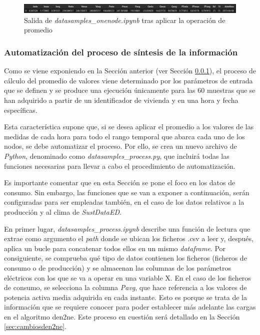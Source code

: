 \vspace{3mm}

\begin{figure}[h!]
  \centering
  \includegraphics[width=1\textwidth]{img/diseno/datasamples.png}
  \caption{Salida de \textit{datasamples\_onenode.ipynb} tras aplicar la operación de promedio}
  \label{fig:datasamples}
\end{figure}

\subsubsection{Automatización del proceso de síntesis de la información}
\label{sec:datasamples}

Como se viene exponiendo en la Sección anterior (ver Sección \ref{sec:datasamples}), el proceso de cálculo del promedio de valores viene determinado por los parámetros de entrada que se definen y se produce una ejecución únicamente para las 60 muestras que se han adquirido a partir de un identificador de vivienda y en una hora y fecha específicas. 

\vspace{3mm}

Esta característica supone que, si se desea aplicar el promedio a los valores de las medidas de cada hora para todo el rango temporal que abarca cada uno de los nodos, se debe automatizar el proceso. Por ello, se crea un nuevo archivo de \textit{Python}, denominado como \textit{datasamples\_process.py}, que incluirá todas las funciones necesarias para llevar a cabo el procedimiento de automatización. 

\vspace{3mm}

Es importante comentar que en esta Sección se pone el foco en los datos de consumo. Sin embargo, las funciones que se van a exponer a continuación, serán configuradas para ser empleadas también, en el caso de los datos relativos a la producción y al clima de \textit{SustDataED}.

\vspace{3mm}

En primer lugar, \textit{datasamples\_process.ipynb} describe una función de lectura que extrae como argumento el \textit{path} donde se ubican los ficheros .csv a leer y, después, aplica un bucle para concatenar todos ellos en un mismo \textit{dataframe}. Por consiguiente, se comprueba qué tipo de datos contienen los ficheros (ficheros de consumo o de producción) y se almacenan las columnas de los parámetros eléctricos con los que se va a operar en una variable X. En el caso de los ficheros de consumo, se selecciona la columna \textit{Pavg}, que hace referencia a los valores de potencia activa media adquirida en cada instante. Esto es porque se trata de la información que se requiere conocer para poder establecer más adelante las cargas en el algoritmo \gls{den2ne}. Este proceso en cuestión será detallado en la Sección \ref{sec:cambiosden2ne}.

